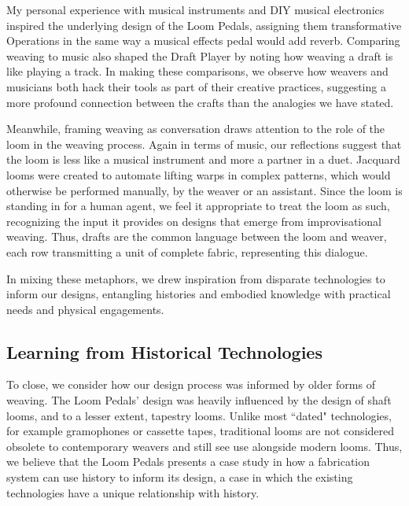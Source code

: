 My personal experience with musical instruments and DIY musical electronics inspired the underlying design of the Loom Pedals, assigning them transformative Operations in the same way a musical effects pedal would add reverb. Comparing weaving to music also shaped the Draft Player by noting how weaving a draft is like playing a track. In making these comparisons, we observe how weavers and musicians both hack their tools as part of their creative practices, suggesting a more profound connection between the crafts than the analogies we have stated. 

Meanwhile, framing weaving as conversation draws attention to the role of the loom in the weaving process. Again in terms of music, our reflections suggest that the loom is less like a musical instrument and more a partner in a duet. Jacquard looms were created to automate lifting warps in complex patterns, which would otherwise be performed manually, by the weaver or an assistant. Since the loom is standing in for a human agent, we feel it appropriate to treat the loom as such, recognizing the input it provides on designs that emerge from improvisational weaving. Thus, drafts are the common language between the loom and weaver, each row transmitting a unit of complete fabric, representing this dialogue. 

In mixing these metaphors, we drew inspiration from disparate technologies to inform our designs, entangling histories and embodied knowledge with practical needs and physical engagements.

\subsection{Learning from Historical Technologies}

To close, we consider how our design process was informed by older forms of weaving. The Loom Pedals' design was heavily influenced by the design of shaft looms, and to a lesser extent, tapestry looms. Unlike most ``dated" technologies, for example gramophones or cassette tapes, traditional looms are not considered obsolete to contemporary weavers and still see use alongside modern looms. Thus, we believe that the Loom Pedals presents a case study in how a fabrication system can use history to inform its design, a case in which the existing technologies have a unique relationship with history.

